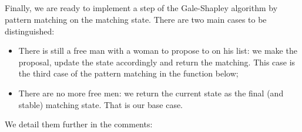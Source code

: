 {\begin{code}
\AgdaOperator{\AgdaInductiveConstructor{,}}\AgdaSpace{}%
\AgdaSymbol{))}\<%
\\
\>[0]\AgdaSpace{}%
\AgdaSymbol{|}\AgdaSpace{}%
\AgdaSymbol{\AgdaUnderscore{}}%
\>[14]\AgdaSymbol{=}%
\>[755I]\AgdaSymbol{(}\AgdaSpace{}%
\AgdaOperator{\AgdaInductiveConstructor{,}}\AgdaSpace{}%
\AgdaSymbol{)}\AgdaSpace{}%
\<%
\\
\>[.][@{}l@{}]\<[755I]%
\>[16]\AgdaSymbol{(}\AgdaSpace{}%
\AgdaSymbol{(}\AgdaSpace{}%
\AgdaSymbol{(}\AgdaSpace{}%
\AgdaOperator{\AgdaInductiveConstructor{,}}\AgdaSpace{}%
\AgdaSymbol{)}\AgdaSpace{}%
\AgdaSpace{}%
\AgdaSymbol{(}\AgdaSpace{}%
\AgdaSpace{}%
\AgdaSymbol{)))}\<%
\\
%
\>[16]\AgdaOperator{\AgdaInductiveConstructor{,}}\<%
\\
%
\>[16]\AgdaSpace{}%
\AgdaSymbol{(}\AgdaSpace{}%
\AgdaSymbol{(}\AgdaSpace{}%
\AgdaOperator{\AgdaInductiveConstructor{,}}\AgdaSpace{}%
\AgdaSymbol{)}\AgdaSpace{}%
\AgdaSpace{}%
\AgdaSymbol{(}\AgdaSpace{}%
\AgdaSpace{}%
\AgdaSymbol{))}\<%
\end{code}

Finally, we are ready to implement a step of the Gale-Shapley algorithm by pattern matching on the matching state. There are two main cases to be distinguished:

\begin{itemize}
    \item There is still a free man with a woman to propose to on his list: we make the proposal, update the state accordingly and return the matching. This case is the third case of the pattern matching in the function below;
    \item There are no more free men: we return the current state as the final (and stable) matching state. That is our base case.
\end{itemize}

We detail them further in the comments:

}
